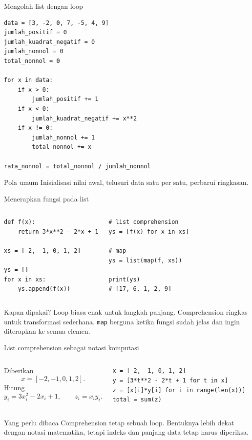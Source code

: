 \documentclass[aspectratio=169,11pt]{beamer}
\begin{document}
\begin{frame}[fragile]{Mengolah list dengan loop}
\begin{lstlisting}
data = [3, -2, 0, 7, -5, 4, 9]
jumlah_positif = 0
jumlah_kuadrat_negatif = 0
jumlah_nonnol = 0
total_nonnol = 0

for x in data:
    if x > 0:
        jumlah_positif += 1
    if x < 0:
        jumlah_kuadrat_negatif += x**2
    if x != 0:
        jumlah_nonnol += 1
        total_nonnol += x

rata_nonnol = total_nonnol / jumlah_nonnol
\end{lstlisting}
\begin{block}{Pola umum}
Inisialisasi nilai awal, telusuri data satu per satu, perbarui ringkasan.
\end{block}
\end{frame}

\begin{frame}[fragile]{Menerapkan fungsi pada list}
\begin{columns}[T]
\begin{lstlisting}
def f(x):
    return 3*x**2 - 2*x + 1

xs = [-2, -1, 0, 1, 2]

ys = []
for x in xs:
    ys.append(f(x))
\end{lstlisting}
\begin{lstlisting}
# list comprehension
ys = [f(x) for x in xs]

# map
ys = list(map(f, xs))

print(ys)
# [17, 6, 1, 2, 9]
\end{lstlisting}
\end{columns}
\begin{block}{Kapan dipakai?}
Loop biasa enak untuk langkah panjang. Comprehension ringkas untuk transformasi sederhana. \texttt{map} berguna ketika fungsi sudah jelas dan ingin diterapkan ke semua elemen.
\end{block}
\end{frame}

\begin{frame}[fragile]{List comprehension sebagai notasi komputasi}
\begin{columns}[T]
Diberikan
\[
x=[-2,-1,0,1,2].
\]
Hitung
\[
y_i=3x_i^2-2x_i+1,
\qquad z_i=x_i y_i.
\]
\begin{lstlisting}
x = [-2, -1, 0, 1, 2]
y = [3*t**2 - 2*t + 1 for t in x]
z = [x[i]*y[i] for i in range(len(x))]
total = sum(z)
\end{lstlisting}
\end{columns}
\begin{block}{Yang perlu dibaca}
Comprehension tetap sebuah loop. Bentuknya lebih dekat dengan notasi matematika, tetapi indeks dan panjang data tetap harus diperiksa.
\end{block}
\end{frame}
\end{document}
